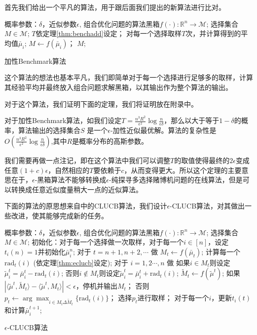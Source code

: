 \documentclass[bachelor]{thuthesis}
\begin{document}
首先我们给出一个平凡的算法，用于跟后面我们提出的新算法进行比对。

\begin{algorithm}[h]
\centering
\begin{algorithmic}
\REQUIRE 概率参数：$\delta$，近似参数$\epsilon$, 组合优化问题的算法黑箱$f(\cdot):\mathbb{R}^n\to \mathcal{M}$;
\ENSURE 选择集合 $M\in \mathcal{M}$;
\STATE $T$依定理\ref{thm:benchadd}设定；
\STATE 对每一个选择取样$T$次，并计算得到的平均值$\bar{\mu}_i$;
\STATE  $M\gets f(\bar{\mu}_i)$；
\RETURN $M$;
\end{algorithmic}
\caption{加性Benchmark算法}
\label{alg:benchmark}
\end{algorithm}

这个算法的想法也基本平凡，我们即简单对于每一个选择进行足够多的取样，计算其经验平均并最终放入组合问题求解黑箱，以其输出作为整个算法的输出。

对于这个算法，我们证明下面的定理，我们将证明放在附录中。

\begin{theorem}
\label{thm:benchadd}

对于加性Benchmark算法，如我们设定$T=\frac{n^3R^2}{\epsilon^2}\log \frac{n}{\epsilon\delta}$，那么以大于等于$1-\delta$的概率，算法输出的选择集合$S$ 是一个$\epsilon$-加性近似最优解。算法的复杂性是$O\left(\frac{n^3R^2}{\epsilon^2}\log \frac{n}{\epsilon\delta}\right)$,其中$R$是概率分布的高斯参数。

\end{theorem}

我们需要再做一点注记，即在这个算法中我们可以调整$T$的取值使得最终的$2\epsilon$变成任意$(1+c)\epsilon$，自然相应的$T$要依赖于$c$，从而变得更大。所以这个定理的主要意思在于，$\epsilon$-黑箱算法不能够转换成$\epsilon$-纯探寻多选择赌博机问题的在线算法，但是可以转换成任意近似度量稍大一点的近似算法。

下面的算法的原思想来自\cite{cpemab}中的CLUCB算法，我们设计$\epsilon$-CLUCB算法，对其做出一些改进，使其能够完成新的任务。

\begin{algorithm}[h]
\centering
\begin{algorithmic}
\REQUIRE 概率参数：$\delta$，近似参数$\epsilon$, 组合优化问题的算法黑箱$f(\cdot):\mathbb{R}^n\to \mathcal{M}$;
\ENSURE 选择集合 $M\in \mathcal{M}$;
\STATE 初始化：对于每一个选择做一次取样，对于每一个$i\in[n]$，设定$t_i(n)=1$并初始化$\bar{\mu}^n_i$;
\STATE 对于 $t=n+1,n+2,\cdots$ 做
\STATE $M_t\gets f(\bar{\mu}_{t})$;
\STATE 计算每一个$\text{rad}_t(i)$ (依定理\ref{thm:eclucb}设定);
\STATE 对于 $i=1,2\cdots,n$ 做
\STATE 如果$i\in M_t$则设定$\tilde{\mu}^t_i=\bar{\mu}^{t}_i-\text{rad}_t(i)$;
\STATE 否则$i\notin M_t$则设定$\tilde{\mu}^t_i=\bar{\mu}^{t}_i+\text{rad}_t(i)$;
\STATE $\tilde{M}_t\gets f(\tilde{\mu}^{t})$;
\STATE 如果$|\langle \tilde{\mu}^t,\tilde{M}_t\rangle-\langle \tilde{\mu}^t,M_t\rangle|<\epsilon$，停机并输出$M_t$；
\STATE 否则$p_t\gets \arg\max_{i\in M_t\Delta \tilde{M}_{t}}\{\text{rad}_t(i)\}$；
\STATE 选择$p_t$进行取样；
\STATE 对于每一个$i$，更新$t_i(t)$和计算$\bar{\mu}^{t+1}_i$;
\end{algorithmic}
\caption{$\epsilon$-CLUCB算法}
\label{alg:eclucb}
\end{algorithm}
\end{document}
